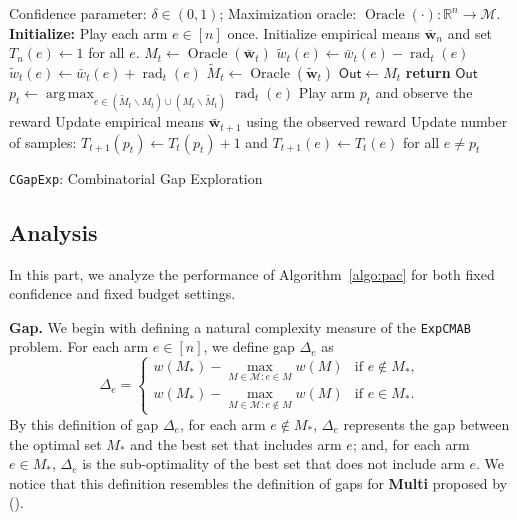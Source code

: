 \documentclass{article}
\newcommand{\Algorithm}{\texttt{CGapExp}\xspace}
\newcommand{\Problem}{\texttt{ExpCMAB}\xspace}
\newcommand{\M}{\mathcal M}
\newcommand{\del}{\backslash}
\newcommand{\RR}{\mathbb R}
\DeclareMathOperator{\rad}{rad}
\DeclareMathOperator*{\argmax}{arg\,max}
\DeclareMathOperator{\Oracle}{Oracle}
\newcommand{\out}{\mathsf{Out}}
\newcommand{\MultiIdent}{\textbf{Multi}\xspace}
\renewcommand{\vec}[1]{\boldsymbol{#1}}
\begin{document}
\begin{spacing}{1.1}
\begin{algorithm}[htbp]
\begin{algorithmic}[1]
\Require Confidence parameter: $\delta \in (0,1)$; Maximization oracle: $\Oracle(\cdot): \RR^n \rightarrow \M$.
\Statex \textbf{Initialize:} Play each arm $e \in [n]$ once. Initialize empirical means $\vec {\bar w}_n$ and set $T_{n}(e) \gets 1$ for all $e$.
	\State $M_t \gets \Oracle(\vec {\bar w}_t)$
			\State $\tilde w_t(e) \gets \bar w_t(e)-\rad_t(e)$
		\Else
			\State $\tilde w_t(e) \gets \bar w_t(e)+\rad_t(e)$
		\EndIf
	\EndFor
	\State $\tilde M_t \gets \Oracle(\vec{\tilde w}_t)$
		\State $\out \gets M_t$
		\State \textbf{return} $\out$
	\EndIf
	\State $p_t \gets \argmax_{e\in (\tilde M_t \del M_t) \cup (M_t \del \tilde M_t)} \rad_t(e)$\label{algo:step:D}
	\State Play arm $p_t$ and observe the reward
	\State Update empirical means $\vec {\bar w}_{t+1}$ using the observed reward
	\State Update number of samples: $T_{t+1}(p_t)\gets T_{t}(p_t)+1$ and $T_{t+1}(e) \gets T_{t}(e)$ for all $e\not=p_t$
	\EndFor
\end{algorithmic}
\caption{\Algorithm: Combinatorial Gap Exploration}
\label{algo:pac}
\end{algorithm}


\subsection{Analysis}
In this part, we analyze the performance of Algorithm~\ref{algo:pac} for both fixed confidence and fixed budget settings. 


\textbf{Gap.} We begin with defining a natural complexity measure of the \Problem problem. 
For each arm $e \in [n]$, we define gap $\Delta_e$ as
\begin{equation}
\label{eq:define-delta}
\Delta_e = \begin{cases}
			   w(M_*)-\max_{M\in \M: e\in M} w(M) & \text{if } e\not \in M_*, \\
			   w(M_*)-\max_{M\in \M: e\not \in M} w(M) & \text{if } e\in M_*.
			\end{cases}
\end{equation}
By this definition of gap $\Delta_e$, for each arm $e\not\in M_*$, $\Delta_e$ represents the gap between the optimal set $M_*$ and the best set that includes arm $e$; and, for each arm $e\in M_*$, $\Delta_e$ is the sub-optimality of the best set that does not include arm $e$.
We notice that this definition resembles the definition of gaps for \MultiIdent proposed by ().




\end{spacing}
\end{document}
